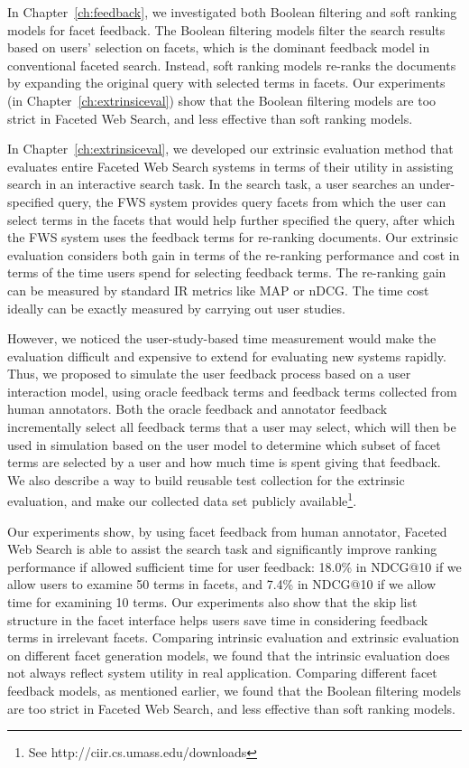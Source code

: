 In Chapter~\ref{ch:feedback}, we investigated both Boolean filtering and soft ranking models for facet feedback. The Boolean filtering models filter the search results based on users' selection on facets, which is the dominant feedback model in conventional faceted search. Instead, soft ranking models re-ranks the documents by expanding the original query with selected terms in facets. Our experiments (in Chapter~\ref{ch:extrinsiceval}) show that the Boolean filtering models are too strict in Faceted Web Search, and less effective than soft ranking models.

In Chapter~\ref{ch:extrinsiceval}, we developed our extrinsic evaluation method that evaluates entire Faceted Web Search systems in terms of their utility in assisting search in an interactive search task. In the search task, a user searches an under-specified query, the FWS system provides query facets from which the user can select terms in the facets that would help further specified the query, after which the FWS system uses the feedback terms for re-ranking documents. Our extrinsic evaluation considers both gain in terms of the re-ranking performance and cost in terms of the time users spend for selecting feedback terms. The re-ranking gain can be measured by standard IR metrics like MAP or nDCG. The time cost ideally can be exactly measured by carrying out user studies. 

However, we noticed the user-study-based time measurement would make the evaluation difficult and expensive to extend for evaluating new systems rapidly. Thus, we proposed to simulate the user feedback process based on a user interaction model, using oracle feedback terms and feedback terms collected from human annotators. Both the oracle feedback and annotator feedback incrementally select all feedback terms that a user may select, which will then be used in simulation based on the user model to determine which subset of facet terms are selected by a user and how much time is spent giving that feedback. We also describe a way to build reusable test collection for the extrinsic evaluation, and make our collected data set publicly available\footnote{See http://ciir.cs.umass.edu/downloads}.

Our experiments show, by using facet feedback from human annotator, Faceted Web Search is able to assist the search task and significantly improve ranking performance if allowed sufficient time for user feedback: 18.0\% in NDCG@10 if we allow users to examine 50 terms in facets, and 7.4\% in NDCG@10 if we allow time for examining 10 terms. Our experiments also show that the skip list structure in the facet interface helps users save time in considering feedback terms in irrelevant facets. Comparing intrinsic evaluation and extrinsic evaluation on different facet generation models, we found that the intrinsic evaluation does not always reflect system utility in real application. Comparing different facet feedback models, as mentioned earlier, we found that the Boolean filtering models are too strict in Faceted Web Search, and less effective than soft ranking models.

